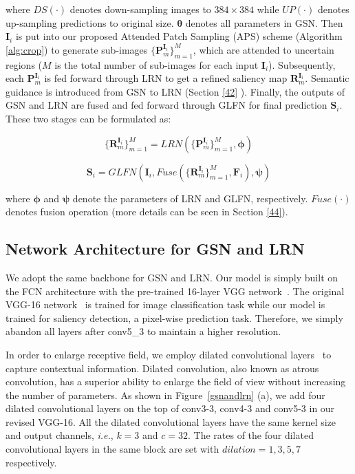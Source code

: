 where $DS(\cdot)$ denotes down-sampling images to $384\times384$ while $UP(\cdot)$ denotes up-sampling predictions to original size. $\bm{\theta}$ denotes all parameters in GSN. Then 
$\bm{I}_i$ is put into our proposed Attended Patch Sampling (APS) scheme (Algorithm \ref{alg:crop}) to generate sub-images $\{\bm{P}_m^{\bm{I}_i}\}_{m=1}^M$, which are attended to uncertain regions ($M$ is the total number of sub-images for each input $\bm{I}_i$). Subsequently, each $\bm{P}_m^{\bm{I}_i}$ is fed forward through LRN to get a refined saliency map $\bm{R}_m^{\bm{I}_i}$. Semantic guidance is introduced from GSN to LRN (Section \ref{42} ). Finally, the outputs of GSN and LRN are fused and fed forward through GLFN for final prediction $\bm{S}_i$. These two stages can be formulated as:

\begin{equation}
\{\bm{R}_m^{\bm{I}_i}\}_{m=1}^M = LRN(\{\bm{P}_m^{\bm{I}_i}\}_{m=1}^M, \bm{\phi})
\end{equation}

\begin{equation}
\bm{S}_i = GLFN(\bm{I}_i, Fuse(\{\bm{R}_m^{\bm{I}_i}\}_{m=1}^M, \bm{F}_i), \bm{\psi})
\end{equation}

where $\bm{\phi}$ and $\bm{\psi}$ denote the parameters of LRN and GLFN, respectively. $Fuse(\cdot)$ denotes fusion operation (more details can be seen in Section \ref{44}).

\subsection{Network Architecture for GSN and LRN}

We adopt the same backbone for GSN and LRN. Our model is simply built on the FCN architecture with the pre-trained 16-layer VGG network~\cite{simonyan2014very}. The original VGG-16 network~\cite{simonyan2014very} is trained for image classification task while our model is trained for saliency detection, a pixel-wise prediction task. Therefore, we simply abandon all layers after conv5\_3 to maintain a higher resolution.

In order to enlarge receptive field, we employ dilated convolutional layers~\cite{yu2015multi} to capture contextual information. Dilated convolution, also known as atrous convolution, has a superior ability to enlarge the field of view without increasing the number of parameters. As shown in Figure~\ref{gsnandlrn} (a), we add four dilated convolutional layers on the top of conv3-3, conv4-3 and conv5-3 in our revised VGG-16. All the dilated convolutional layers have the same kernel size and output channels, \emph{i.e.}, $k=3$ and $c=32$. The rates of the four dilated convolutional layers in the same block are set with $dilation=1, 3, 5, 7$ respectively.

